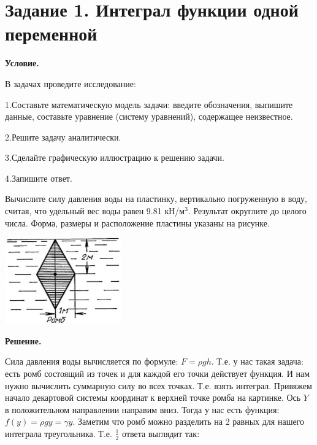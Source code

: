 \section{Задание 1. Интеграл функции одной переменной}

\textbf{Условие.}

В задачах проведите исследование:

1.Составьте математическую модель задачи: введите обозначения, выпишите данные,  составьте уравнение (систему уравнений), содержащее неизвестное.

2.Решите задачу аналитически.

3.Сделайте графическую иллюстрацию к решению задачи.

4.Запишите ответ.

\vspace{5mm}

\begin{multicols}{2}
    Вычислите силу давления воды на пластинку,
    вертикально погруженную в воду,
    считая, что удельный вес воды равен 9.81 кН/м$^3$.  
    Результат округлите до целого числа.
    Форма, размеры и расположение пластины указаны на рисунке.

    \includegraphics[width=5cm]{images/1a1}

\end{multicols}

\vspace{10mm}

\textbf{Решение.}

Сила давления воды вычисляется по формуле: $F = \rho g h$. Т.е. у нас такая задача: есть ромб состоящий из точек и для каждой его точки 
действует функция. И нам нужно вычислить суммарную силу во всех точках. Т.е. взять интеграл. Привяжем начало декартовой системы координат к верхней точке ромба на картинке.
Ось $Y$ в положительном направлении направим вниз. Тогда у нас есть функция: $f(y) = \rho g y = \gamma y$. Заметим что ромб можно разделить на 2 равных для нашего интеграла треугольника.
Т.е. $\frac{1}{2}$ ответа выглядит так:


